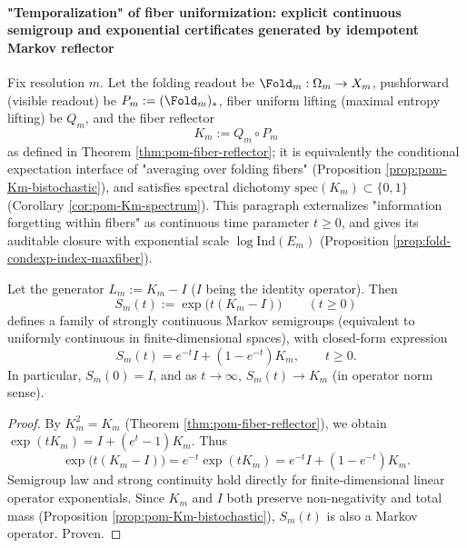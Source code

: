 \paragraph{"Temporalization" of fiber uniformization: explicit continuous semigroup and exponential certificates generated by idempotent Markov reflector}
Fix resolution \(m\). Let the folding readout be \(\Fold_m:\Omega_m\to X_m\), pushforward (visible readout) be \(P_m:=(\Fold_m)_\ast\), fiber uniform lifting (maximal entropy lifting) be \(Q_m\), and the fiber reflector
\[
K_m:=Q_m\circ P_m
\]
as defined in Theorem \ref{thm:pom-fiber-reflector}; it is equivalently the conditional expectation interface of "averaging over folding fibers" (Proposition \ref{prop:pom-Km-bistochastic}), and satisfies spectral dichotomy \(\mathrm{spec}(K_m)\subset\{0,1\}\) (Corollary \ref{cor:pom-Km-spectrum}).
This paragraph externalizes "information forgetting within fibers" as continuous time parameter \(t\ge 0\), and gives its auditable closure with exponential scale \(\log\mathrm{Ind}(E_m)\) (Proposition \ref{prop:fold-condexp-index-maxfiber}).
\par

\begin{theorem}\label{thm:xi-fiber-uniformization-markov-semigroup-explicit}
Let the generator \(L_m:=K_m-I\) (\(I\) being the identity operator).
Then
\[
S_m(t):=\exp\!\bigl(t(K_m-I)\bigr)\qquad (t\ge 0)
\]
defines a family of strongly continuous Markov semigroups (equivalent to uniformly continuous in finite-dimensional spaces), with closed-form expression
\[
\boxed{\;
S_m(t)=e^{-t}I+(1-e^{-t})K_m,\qquad t\ge 0.
\;}
\]
In particular, \(S_m(0)=I\), and as \(t\to\infty\), \(S_m(t)\to K_m\) (in operator norm sense).
\end{theorem}
\begin{proof}
By \(K_m^2=K_m\) (Theorem \ref{thm:pom-fiber-reflector}), we obtain
\(
\exp(tK_m)=I+(e^{t}-1)K_m
\).
Thus
\[
\exp\!\bigl(t(K_m-I)\bigr)
=e^{-t}\exp(tK_m)
=e^{-t}I+(1-e^{-t})K_m.
\]
Semigroup law and strong continuity hold directly for finite-dimensional linear operator exponentials.
Since \(K_m\) and \(I\) both preserve non-negativity and total mass (Proposition \ref{prop:pom-Km-bistochastic}), \(S_m(t)\) is also a Markov operator. Proven.
\end{proof}

